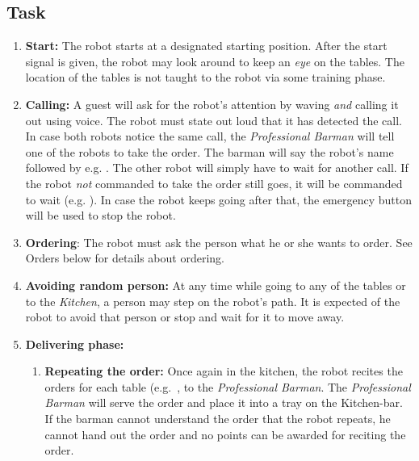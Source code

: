 \subsection{Task}
\begin{enumerate}
	\item \textbf{Start:} The robot starts at a designated starting position. After the start signal is given, the robot may look around to keep an \textit{eye} on the tables.
	  The location of the tables is not taught to the robot via some training phase.

	\item \textbf{Calling:} A guest will ask for the robot's attention by waving \emph{and} calling it out using voice.
	  The robot must state out loud that it has detected the call.
	  In case both robots notice the same call, the \textit{Professional Barman} will tell one of the robots to take the order.
	  The barman will say the robot's name followed by  e.g. .
	  The other robot will simply have to wait for another call.
	  If the robot \textit{not} commanded to take the order still goes, it will be commanded to wait (e.g. ).
	  In case the robot keeps going after that, the emergency button will be used to stop the robot.


	\item \textbf{Ordering}: The robot must ask the person what he or she wants to order. See Orders below for details about ordering.
	\item \textbf{Avoiding random person:} At any time while going to any of the tables or to the \textit{Kitchen}, a person may step on the robot's path.
	  It is expected of the robot to avoid that person or stop and wait for it to move away.

	\item \textbf{Delivering phase:}
	\begin{enumerate}
		\item \textbf{Repeating the order:} Once again in the kitchen, the robot recites the orders for each table (e.g.~\textit{}, to the \textit{Professional Barman}.
		  The \textit{Professional Barman} will serve the order and place it into a tray on the Kitchen-bar.
		  If the barman cannot understand the order that the robot repeats, he cannot hand out the order and no points can be awarded for reciting the order.


\end{enumerate}
\end{enumerate}
